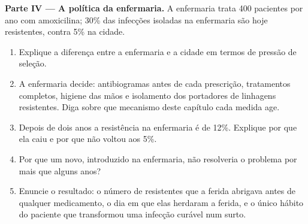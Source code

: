 \begin{problem}
\medskip
\noindent\textbf{Parte IV --- A política da enfermaria.}
A enfermaria trata 400 pacientes por ano com amoxicilina; 30\% das
infecções isoladas na enfermaria são hoje resistentes, contra 5\% na
cidade.
\begin{enumerate}[resume]
  \item Explique a diferença entre a enfermaria e a cidade em termos de
        pressão de seleção.
  \item A enfermaria decide: antibiogramas antes de cada prescrição,
        tratamentos completos, higiene das mãos e isolamento dos
        portadores de linhagens resistentes. Diga sobre que mecanismo
        deste capítulo cada medida age.
  \item Depois de dois anos a resistência na enfermaria é de 12\%.
        Explique por que ela caiu e por que não voltou aos 5\%.
  \item Por que um  novo, introduzido na enfermaria, não
        resolveria o problema por mais que alguns anos?
  \item Enuncie o resultado: o número de  resistentes que a
        ferida abrigava antes de qualquer medicamento, o dia em que
        elas herdaram a ferida, e o único hábito do paciente que
        transformou uma infecção curável num surto.
\end{enumerate}
\end{problem}
